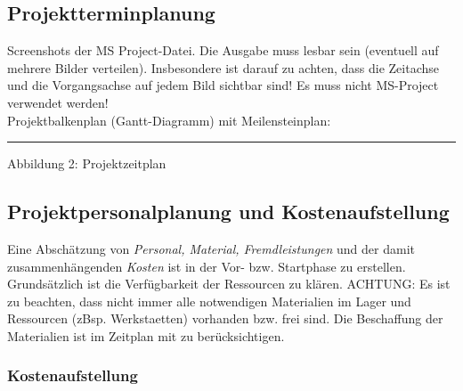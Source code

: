 \documentclass[12pt,a4paper]{article}
\newcommand{\yhbu}[0]{\color{ydkbu}}	%
\begin{document}
{ \subsection{Projektterminplanung}
	{\yhbu
	Screenshots der MS Project-Datei.
	Die Ausgabe muss lesbar sein (eventuell auf mehrere Bilder verteilen).
	Insbesondere ist darauf zu achten,
	dass die Zeitachse und die Vorgangsachse auf jedem Bild sichtbar sind!
	Es muss nicht MS-Project verwendet werden!
	\\[2mm]
	Projektbalkenplan (Gantt-Diagramm) mit Meilensteinplan:
	}
	\\[2mm]
	\hspace*{12mm}
	\rule{37mm}{0pt} Abbildung 2: Projektzeitplan

 \subsection{Projektpersonalplanung und Kostenaufstellung}
	{\yhbu
	Eine Abschätzung von
	{\em Personal, Material, Fremdleistungen}
	und der damit zusammenhängenden {\em Kosten}
	ist in der Vor- bzw. Startphase zu erstellen.
	\\[1mm]
	Grundsätzlich ist die Verfügbarkeit der Ressourcen zu klären.
	ACHTUNG: Es ist zu beachten,
	dass nicht immer alle notwendigen Materialien im Lager
	und Ressourcen (zBsp. Werkstaetten)
	vorhanden bzw. frei sind.
	Die Beschaffung der Materialien ist im Zeitplan mit zu berücksichtigen.
	}
  \subsubsection{Kostenaufstellung}
	\begin{center}
	

\end{center}}
\end{document}
